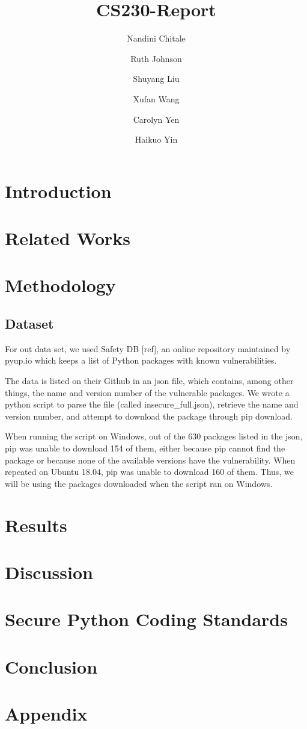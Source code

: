 \documentclass[acmlarge]{acmart}
\title{CS230-Report}
\author{Nandini Chitale}
\author{Ruth Johnson}
\author{Shuyang Liu}
\author{Xufan Wang}
\author{Carolyn Yen}
\author{Haikuo Yin}
\begin{document}
\maketitle

\begin{abstract}
    
\end{abstract}
\section{Introduction}

\section{Related Works}

\section{Methodology}

\subsection{Dataset}
For out data set, we used Safety DB [ref], an online repository maintained by pyup.io which keeps a list of Python packages with known vulnerabilities. 

The data is listed on their Github in an json file, which contains, among other things, the name and version number of the vulnerable packages. We wrote a python script to parse the file (called insecure\_full.json), retrieve the name and version number, and attempt to download the package through pip download.

When running the script on Windows, out of the 630 packages listed in the json, pip was unable to download 154 of them, either because pip cannot find the package or because none of the available versions have the vulnerability. When repeated on Ubuntu 18.04, pip was unable to download 160 of them. Thus, we will be using the packages downloaded when the script ran on Windows.

\section{Results}

\section{Discussion}

\section{Secure Python Coding Standards}

\section{Conclusion}

\section{Appendix}



\end{document}
